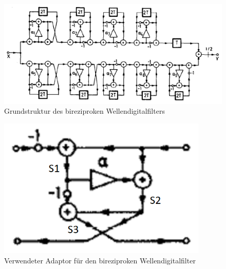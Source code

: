 \begin{figure}[h!]
	\centering	\includegraphics[width=15cm]{img/BireziprokerFilter.png}
	\caption{Grundstruktur des bireziproken Wellendigitalfilters \cite[][S. 85]{gaszi1983}}
	\label{fig:bireziprok_Struktur}
\end{figure}
\begin{figure}[h!]
	\centering	\includegraphics[width=10cm]{img/Adapter.png}
	\caption{Verwendeter Adaptor für den bireziproken Wellendigitalfilter \cite[][S. 77]{gaszi1983}}
	\label{fig:Adaptor}
\end{figure}

